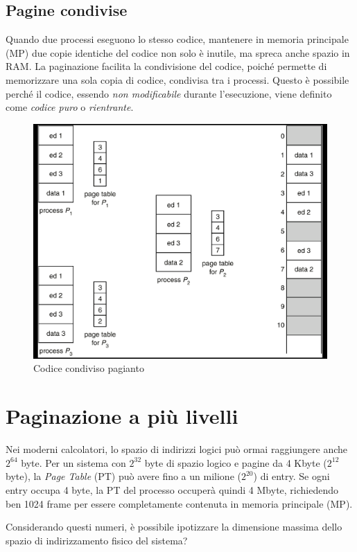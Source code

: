 \subsection{Pagine condivise}
Quando due processi eseguono lo stesso codice, mantenere in memoria principale (MP) due copie identiche del codice non solo è inutile, ma spreca anche spazio in RAM. La paginazione facilita la condivisione del codice, poiché permette di memorizzare una sola copia di codice, condivisa tra i processi. Questo è possibile perché il codice, essendo \emph{non modificabile} durante l'esecuzione, viene definito come \emph{codice puro} o \emph{rientrante}.


\begin{figure}[h] \centering \includegraphics[width=0.45\linewidth]{images/shared_code_paginatedEnv.png} \caption{Codice condiviso pagianto} \label{fig:9.9a} \end{figure}

\section{Paginazione a più livelli}

Nei moderni calcolatori, lo spazio di indirizzi logici può ormai raggiungere anche \(2^{64}\) byte. Per un sistema con \(2^{32}\) byte di spazio logico e pagine da 4 Kbyte (\(2^{12}\) byte), la \emph{Page Table} (PT) può avere fino a un milione (\(2^{20}\)) di entry. Se ogni entry occupa 4 byte, la PT del processo occuperà quindi 4 Mbyte, richiedendo ben 1024 frame per essere completamente contenuta in memoria principale (MP).

\qs{} {
Considerando questi numeri, è possibile ipotizzare la dimensione massima dello spazio di indirizzamento fisico del sistema?
}

